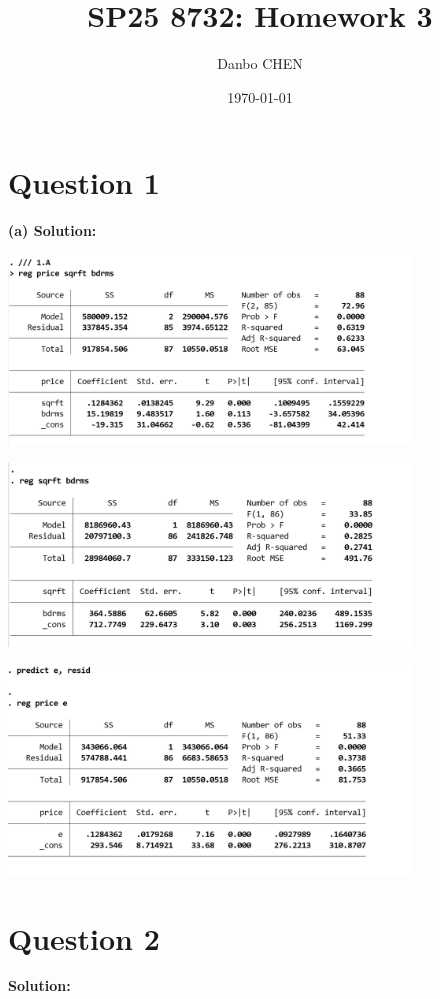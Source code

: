 \documentclass{article}
\title{SP25 8732: Homework 3}
\author{Danbo CHEN}
\date{\today}
\begin{document}
\maketitle
\vspace{.25in}

\section{Question 1}
\textbf{(a) Solution:}

\begin{center}
    
    \includegraphics[width=0.8\textwidth]{Figure/P1.A.jpg}

    \includegraphics[width=0.8\textwidth]{Figure/P1.B.jpg}

    \includegraphics[width=0.8\textwidth]{Figure/P1.C.jpg}

\end{center}


\section{Question 2}
\textbf{Solution:}
\end{document}
